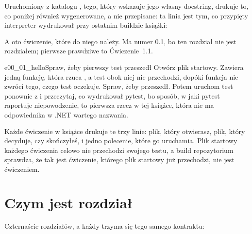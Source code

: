 \noindent
Uruchomiony z katalogu , tego, który wskazuje jego własny
docstring, drukuje to, co poniżej \dash{} również wygenerowane, a nie
przepisane: ta linia jest tym, co przypięty interpreter wydrukował przy
ostatnim buildzie książki:


\noindent
A oto ćwiczenie, które do niego należy. Ma numer 0.1, bo ten rozdział nie
jest rozdziałem; pierwsze prawdziwe to Ćwiczenie~1.1.

\begin{exercise}{e00_01_hello}{Spraw, żeby pierwszy test przeszedł}
Otwórz plik startowy. Zawiera jedną funkcję, która rzuca
, a test obok niej nie przechodzi, dopóki funkcja
nie zwróci tego, czego test oczekuje. Spraw, żeby przeszedł. Potem uruchom
test ponownie z  i przeczytaj, co wydrukował pytest, bo sposób, w
jaki pytest raportuje niepowodzenie, to pierwsza rzecz w tej książce, która
nie ma odpowiednika w .NET wartego nazwania.
\end{exercise}

\noindent
Każde ćwiczenie w książce drukuje te trzy linie: plik, który otwierasz, plik,
który decyduje, czy skończyłeś, i jedno polecenie, które go uruchamia. Plik
startowy każdego ćwiczenia celowo nie przechodzi swojego testu, a build
repozytorium sprawdza, że tak jest \dash{} ćwiczenie, którego plik startowy
już przechodzi, nie jest ćwiczeniem.

\section*{Czym jest rozdział}

Czternaście rozdziałów, a każdy trzyma się tego samego kontraktu:

